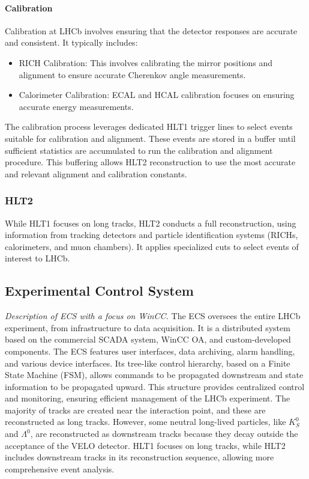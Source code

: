 \paragraph{Calibration}
Calibration at LHCb involves ensuring that the detector responses are accurate and consistent. It typically includes:
\begin{itemize}
\item RICH Calibration: This involves calibrating the mirror positions and alignment to ensure accurate Cherenkov angle measurements.
\item Calorimeter Calibration: ECAL and HCAL calibration focuses on ensuring accurate energy measurements.
\end{itemize}
The calibration process leverages dedicated HLT1 trigger lines to select events suitable for calibration and alignment. These events are stored in a buffer until sufficient statistics are accumulated to run the calibration and alignment procedure. This buffering allows HLT2 reconstruction to use the most accurate and relevant alignment and calibration constants.
\subsubsection{HLT2}
While HLT1 focuses on long tracks, HLT2 conducts a full reconstruction, using information from tracking detectors and particle identification systems (RICHs, calorimeters, and muon chambers). It applies specialized cuts to select events of interest to LHCb.

\subsection{Experimental Control System}
\textit{Description of ECS with a focus on WinCC.
}
The ECS\cite{GranadoCardoso:2702137} oversees the entire LHCb experiment, from infrastructure to data acquisition. It is a distributed system based on the commercial SCADA system, WinCC OA, and custom-developed components. The ECS features user interfaces, data archiving, alarm handling, and various device interfaces. Its tree-like control hierarchy, based on a Finite State Machine (FSM), allows commands to be propagated downstream and state information to be propagated upward. This structure provides centralized control and monitoring, ensuring efficient management of the LHCb experiment.
The majority of tracks are created near the interaction point, and these are reconstructed as long tracks. However, some neutral long-lived particles, like $K^0_S$ and $\Lambda^0$, are reconstructed as downstream tracks because they decay outside the acceptance of the VELO detector. HLT1 focuses on long tracks, while HLT2 includes downstream tracks in its reconstruction sequence, allowing more comprehensive event analysis.


